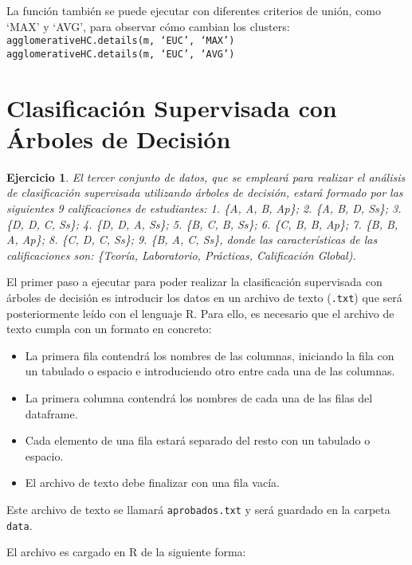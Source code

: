 \documentclass[12pt]{report}\usepackage[]{graphicx}\usepackage[dvipsnames]{xcolor}
\newtheorem{exercise}{Ejercicio}[section]
\begin{document}
	La función también se puede ejecutar con diferentes criterios de unión, como `MAX' y `AVG', para observar cómo cambian los clusters:\\
	
	\texttt{agglomerativeHC.details(m, `EUC', `MAX')}\\
	
	\texttt{agglomerativeHC.details(m, `EUC', `AVG')}
	
	\section{Clasificación Supervisada con Árboles de Decisión}
	
	\begin{exercise}
		El tercer conjunto de datos, que se empleará para realizar el análisis de clasificación supervisada utilizando árboles de decisión, estará formado por las siguientes 9 calificaciones de estudiantes: 1. \{A, A, B, Ap\}; 2. \{A, B, D, Ss\}; 3. \{D, D, C, Ss\}; 4. \{D, D, A, Ss\}; 5. \{B, C, B, Ss\}; 6. \{C, B, B, Ap\}; 7. \{B, B, A, Ap\}; 8. \{C, D, C, Ss\}; 9. \{B, A, C,
		Ss\}, donde las características de las calificaciones son: \{Teoría, Laboratorio, Prácticas, Calificación Global).
	\end{exercise}
	
	El primer paso a ejecutar para poder realizar la clasificación supervisada con árboles de decisión es introducir los datos en un archivo de texto (\texttt{.txt}) que será posteriormente leído con el lenguaje R. Para ello, es necesario que el archivo de texto cumpla con un formato en concreto:
	
	\begin{itemize}
		\item La primera fila contendrá los nombres de las columnas, iniciando la fila con un tabulado o espacio e introduciendo otro entre cada una de las columnas.
		\item La primera columna contendrá los nombres de cada una de las filas del dataframe.
		\item Cada elemento de una fila estará separado del resto con un tabulado o espacio.
		\item El archivo de texto debe finalizar con una fila vacía.
	\end{itemize}
	
	Este archivo de texto se llamará \texttt{aprobados.txt} y será guardado en la carpeta \texttt{data}.
	
	El archivo es cargado en R de la siguiente forma:
	
\end{document}
